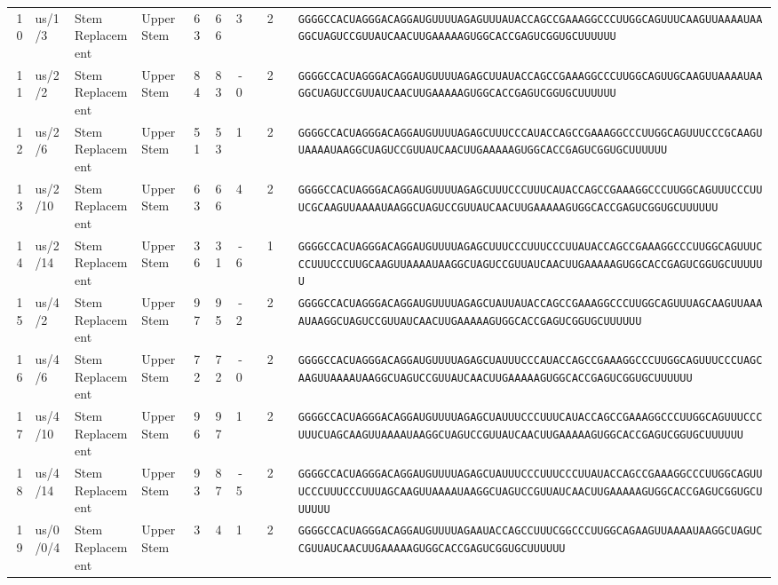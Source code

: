 \begin{tabular}{rlllrrrrrcl}
 10 &
 us/1/3 &
 Stem Replacement &
 Upper Stem &
 63 &
 66 &
 3 &
  &
 2 &
  &
 \verb|GGGGCCACUAGGGACAGGAUGUUUUAGAGUUUAUACCAGCCGAAAGGCCCUUGGCAGUUUCAAGUUAAAAUAAGGCUAGUCCGUUAUCAACUUGAAAAAGUGGCACCGAGUCGGUGCUUUUUU| \\
 11 &
 us/2/2 &
 Stem Replacement &
 Upper Stem &
 84 &
 83 &
 -0 &
  &
 2 &
  &
 \verb|GGGGCCACUAGGGACAGGAUGUUUUAGAGCUUAUACCAGCCGAAAGGCCCUUGGCAGUUGCAAGUUAAAAUAAGGCUAGUCCGUUAUCAACUUGAAAAAGUGGCACCGAGUCGGUGCUUUUUU| \\
 12 &
 us/2/6 &
 Stem Replacement &
 Upper Stem &
 51 &
 53 &
 1 &
  &
 2 &
  &
 \verb|GGGGCCACUAGGGACAGGAUGUUUUAGAGCUUUCCCAUACCAGCCGAAAGGCCCUUGGCAGUUUCCCGCAAGUUAAAAUAAGGCUAGUCCGUUAUCAACUUGAAAAAGUGGCACCGAGUCGGUGCUUUUUU| \\
 13 &
 us/2/10 &
 Stem Replacement &
 Upper Stem &
 63 &
 66 &
 4 &
  &
 2 &
  &
 \verb|GGGGCCACUAGGGACAGGAUGUUUUAGAGCUUUCCCUUUCAUACCAGCCGAAAGGCCCUUGGCAGUUUCCCUUUCGCAAGUUAAAAUAAGGCUAGUCCGUUAUCAACUUGAAAAAGUGGCACCGAGUCGGUGCUUUUUU| \\
 14 &
 us/2/14 &
 Stem Replacement &
 Upper Stem &
 36 &
 31 &
 -6 &
  &
 1 &
  &
 \verb|GGGGCCACUAGGGACAGGAUGUUUUAGAGCUUUCCCUUUCCCUUAUACCAGCCGAAAGGCCCUUGGCAGUUUCCCUUUCCCUUGCAAGUUAAAAUAAGGCUAGUCCGUUAUCAACUUGAAAAAGUGGCACCGAGUCGGUGCUUUUUU| \\
 15 &
 us/4/2 &
 Stem Replacement &
 Upper Stem &
 97 &
 95 &
 -2 &
  &
 2 &
  &
 \verb|GGGGCCACUAGGGACAGGAUGUUUUAGAGCUAUUAUACCAGCCGAAAGGCCCUUGGCAGUUUAGCAAGUUAAAAUAAGGCUAGUCCGUUAUCAACUUGAAAAAGUGGCACCGAGUCGGUGCUUUUUU| \\
 16 &
 us/4/6 &
 Stem Replacement &
 Upper Stem &
 72 &
 72 &
 -0 &
  &
 2 &
  &
 \verb|GGGGCCACUAGGGACAGGAUGUUUUAGAGCUAUUUCCCAUACCAGCCGAAAGGCCCUUGGCAGUUUCCCUAGCAAGUUAAAAUAAGGCUAGUCCGUUAUCAACUUGAAAAAGUGGCACCGAGUCGGUGCUUUUUU| \\
 17 &
 us/4/10 &
 Stem Replacement &
 Upper Stem &
 96 &
 97 &
 1 &
  &
 2 &
  &
 \verb|GGGGCCACUAGGGACAGGAUGUUUUAGAGCUAUUUCCCUUUCAUACCAGCCGAAAGGCCCUUGGCAGUUUCCCUUUCUAGCAAGUUAAAAUAAGGCUAGUCCGUUAUCAACUUGAAAAAGUGGCACCGAGUCGGUGCUUUUUU| \\
 18 &
 us/4/14 &
 Stem Replacement &
 Upper Stem &
 93 &
 87 &
 -5 &
  &
 2 &
  &
 \verb|GGGGCCACUAGGGACAGGAUGUUUUAGAGCUAUUUCCCUUUCCCUUAUACCAGCCGAAAGGCCCUUGGCAGUUUCCCUUUCCCUUUAGCAAGUUAAAAUAAGGCUAGUCCGUUAUCAACUUGAAAAAGUGGCACCGAGUCGGUGCUUUUUU| \\
 19 &
 us/0/0/4 &
 Stem Replacement &
 Upper Stem &
 3 &
 4 &
 1 &
  &
 2 &
  &
 \verb|GGGGCCACUAGGGACAGGAUGUUUUAGAAUACCAGCCUUUCGGCCCUUGGCAGAAGUUAAAAUAAGGCUAGUCCGUUAUCAACUUGAAAAAGUGGCACCGAGUCGGUGCUUUUUU| \\

\end{tabular}
